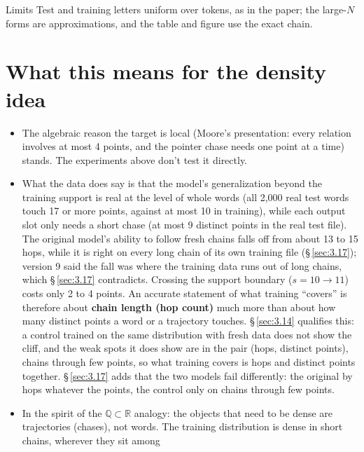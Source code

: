 \documentclass[paper=a4,fontsize=11pt,DIV=11,parskip=half,headings=small,numbers=noendperiod]{scrartcl}
\begin{document}
\begin{limbox}{Limits}
Test and training letters uniform over tokens, as in the paper; the large-$N$ forms are approximations, and the
table and figure use the exact chain.
\end{limbox}

\section{What this means for the density idea}\label{sec:4}
\begin{itemize}
\item The algebraic reason the target is local (Moore’s presentation: every relation involves at most 4 points,
  and the pointer chase needs one point at a time) stands. The experiments above don’t test it directly.
\item What the data does say is that the model’s generalization beyond the training support is real at the level
  of whole words (all 2,000 real test words touch 17 or more points, against at most 10 in training), while each
  output slot only needs a short chase (at most 9 distinct points in the real test file). The original model’s
  ability to follow fresh chains falls off from about 13 to 15 hops, while it is right on every long chain of
  its own training file (\S\,\ref{sec:3.17}); version 9 said the fall was where the training data runs out of
  long chains, which \S\,\ref{sec:3.17} contradicts. Crossing the support boundary ($s=10\to11$) costs only 2 to
  4 points. An accurate statement of what training “covers” is therefore about \textbf{chain length (hop count)}
  much more than about how many distinct points a word or a trajectory touches. \S\,\ref{sec:3.14} qualifies
  this: a control trained on the same distribution with fresh data does not show the cliff, and the weak spots
  it does show are in the pair (hops, distinct points), chains through few points, so what training covers is
  hops and distinct points together. \S\,\ref{sec:3.17} adds that the two models fail differently: the original
  by hops whatever the points, the control only on chains through few points.
\item In the spirit of the $\mathbb{Q}\subset\mathbb{R}$ analogy: the objects that need to be dense are
  trajectories (chases), not words. The training distribution is dense in short chains, wherever they sit among

\end{itemize}
\end{document}
